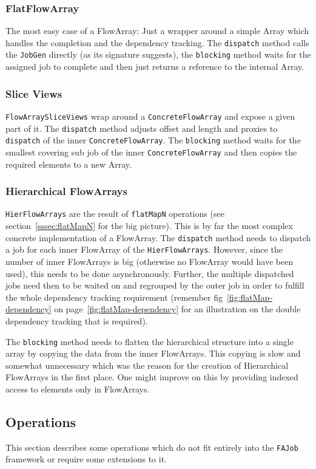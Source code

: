 \documentclass[runningheads,a4paper,fleqn]{llncs}
\begin{document}
\subsubsection{FlatFlowArray}
The most easy case of a FlowArray: Just a wrapper around a simple
Array which handles the completion and the dependency tracking. The
\texttt{dispatch} method calls the \texttt{JobGen} directly (as its
signature suggests), the \texttt{blocking} method waits for the
assigned job to complete and then just returns a reference to the
internal Array.

\subsubsection{Slice Views}
\texttt{FlowArraySliceViews} wrap around a \texttt{ConcreteFlowArray}
and expose a given part of it. The \texttt{dispatch} method adjusts 
offset and length and proxies to \texttt{dispatch} of the inner
\texttt{ConcreteFlowArray}. The \texttt{blocking} method waits for the
smallest covering sub job of the inner \texttt{ConcreteFlowArray} and
then copies the required elements to a new Array.

\subsubsection{Hierarchical FlowArrays}
\texttt{HierFlowArrays} are the result of \texttt{flatMapN} operations
(see section~\ref{sssec:flatMapN} for the big picture). This is by far
the most complex concrete implementation of a FlowArray. The
\texttt{dispatch} method needs to dispatch a job for each inner
FlowArray of the \texttt{HierFlowArrays}. However, since the number of
inner FlowArrays is big (otherwise no FlowArray would have been used),
this needs to be done asynchronously. Further, the multiple dispatched
jobs need then to be waited on and regrouped by the outer job in order
to fulfill the whole dependency tracking requirement (remember
fig~\ref{fig:flatMap-dependency} on
page~\ref{fig:flatMap-dependency} for an illustration on the
double dependency tracking that is required).

The \texttt{blocking} method needs to flatten the hierarchical
structure into a single array by copying the data from the inner
FlowArrays. This copying is slow and somewhat unnecessary which 
was the reason for the creation of Hierarchical FlowArrays in the
first place. One might improve on this by providing indexed access to
elements only in FlowArrays.

\subsection{Operations}
\label{ssec:imp-operations}
This section describes some operations which do not fit entirely into
the \texttt{FAJob} framework or require some extensions to it.
\end{document}
